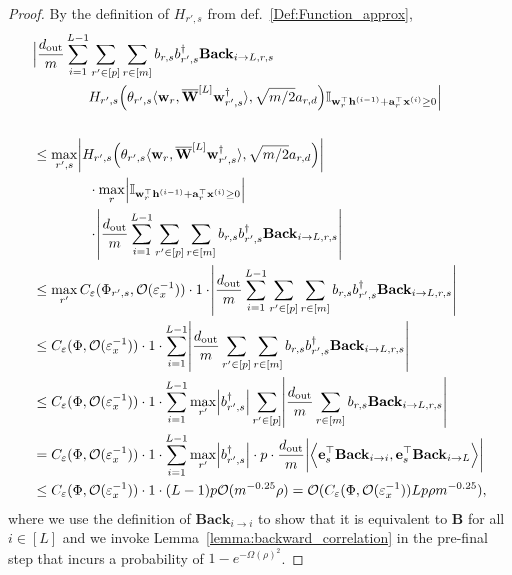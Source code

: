		\begin{proof}
			By the definition of $H_{r', s}$ from def.~\ref{Def:Function_approx},
			\begingroup
			\allowdisplaybreaks
			\begin{align*}
				&\Big|\frac{d_{\mathrm{out}} }{m} \sum_{i=1}^{L-1}  \sum_{r' \in [p]} \sum_{r \in [m]}  b_{r, s} b_{r', s}^{\dagger} \mathbf{Back}_{i \to L, r, s} \\& \quad \quad \quad \quad H_{r', s}\Big(\theta_{r', s} \langle \mathbf{w}_{r}, \overline{\mathbf{W}}^{[L]} \mathbf{w}_{r', s}^{\dagger}\rangle, \sqrt{m/2} a_{r, d}\Big) \mathbb{I}_{\mathbf{w}_r^{\top} \mathbf{h}^{(i-1)} + \mathbf{a}_r^{\top} \mathbf{x}^{(i)} \ge 0}\Big| \\&
				\\& \le \max_{r', s} \abs{H_{r', s}\Big(\theta_{r', s} \langle \mathbf{w}_{r}, \overline{\mathbf{W}}^{[L]} \mathbf{w}_{r', s}^{\dagger}\rangle, \sqrt{m/2} a_{r, d}\Big)} \\& \quad \quad \quad \quad 
				\cdot \max_r \abs{\mathbb{I}_{\mathbf{w}_r^{\top} \mathbf{h}^{(i-1)} + \mathbf{a}_r^{\top} \mathbf{x}^{(i)} \ge 0}}
				\\& \quad \quad \quad \quad \cdot \abs{\frac{d_{\mathrm{out}} }{m} \sum_{i=1}^{L-1}   \sum_{r' \in [p]} \sum_{r \in [m]}  b_{r, s} b_{r', s}^{\dagger} \mathbf{Back}_{i \to L, r, s}} \\&
				\le \max_{r'} C_\varepsilon(\Phi_{r', s}, \mathcal{O}(\varepsilon_x^{-1})) \cdot 1 \cdot \abs{\frac{d_{\mathrm{out}} }{m} \sum_{i=1}^{L-1}  \sum_{r' \in [p]} \sum_{r \in [m]}  b_{r, s} b_{r', s}^{\dagger} \mathbf{Back}_{i \to L, r, s}} \\&
				\le C_\varepsilon(\Phi, \mathcal{O}(\varepsilon_x^{-1})) \cdot 1 \cdot \sum_{i=1}^{L-1}  \abs{\frac{d_{\mathrm{out}} }{m} \sum_{r' \in [p]} \sum_{r \in [m]}  b_{r, s} b_{r', s}^{\dagger} \mathbf{Back}_{i \to L, r, s}} \\&
				\le C_\varepsilon(\Phi, \mathcal{O}(\varepsilon_x^{-1})) \cdot 1 \cdot \sum_{i=1}^{L-1}   \max_{r'}  \abs{b_{r', s}^{\dagger}}  \sum_{r' \in [p]}  \abs{\frac{d_{\mathrm{out}} }{m}  \sum_{r \in [m]}  b_{r, s}  \mathbf{Back}_{i \to L, r, s}} \\&
				= C_\varepsilon(\Phi, \mathcal{O}(\varepsilon_x^{-1})) \cdot 1 \cdot \sum_{i=1}^{L-1}\max_{r'}   \abs{b_{r', s}^{\dagger}} \cdot p \cdot  \frac{d_{\mathrm{out}} }{m} \abs{\left\langle \mathbf{e}_{s}^{\top} \mathbf{Back}_{i \to i},  \mathbf{e}_{s}^{\top} \mathbf{Back}_{i \to L} \right\rangle} \\&
				\le C_\varepsilon(\Phi, \mathcal{O}(\varepsilon_x^{-1})) \cdot 1 \cdot (L-1) p  \mathcal{O}(m^{-0.25} \rho) = \mathcal{O}(C_\varepsilon(\Phi, \mathcal{O}(\varepsilon_x^{-1})) L p \rho m^{-0.25}),
			\end{align*}
			\endgroup
			where we use the definition of $\mathbf{Back}_{i \to i}$ to show that it is equivalent to $\mathbf{B}$ for all $i \in [L]$ and we invoke Lemma~\ref{lemma:backward_correlation} in the pre-final step that incurs a probability of $1 - e^{-\Omega(\rho)^2}$.
		\end{proof}
		\fi
		
